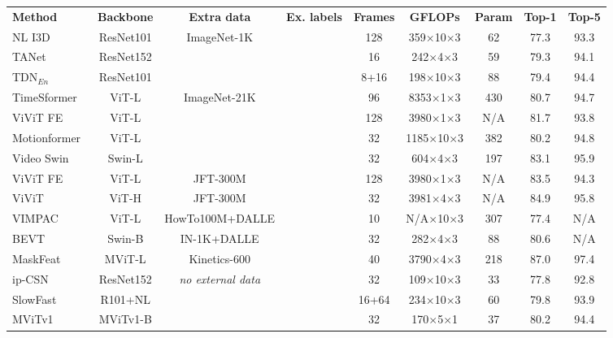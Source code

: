 \documentclass{article}
\newcommand{\cmark}{\ding{51}}%
\newcommand{\xmark}{\ding{55}}%
\def\x{$\times$}
\newcommand{\tablestyle}[2]{\setlength{\tabcolsep}{#1}\renewcommand{\arraystretch}{#2}\centering\footnotesize}
\begin{document}
\begin{table}[t!]
\centering
\tablestyle{2.0pt}{1.04}
\begin{tabular}{l|c|c|c|c|c|c|c|c}
\textbf{Method} & \textbf{Backbone} & \textbf{Extra data} & \textbf{Ex. labels} & \textbf{Frames} & \textbf{GFLOPs}  & \textbf{Param} & \textbf{Top-1}  & \textbf{Top-5} \\
\shline\hline
NL I3D~\cite{nonlocal} & ResNet101 &   \multirow{3}{*}{ImageNet-1K}    & \cmark & 128 & 359\x10\x3  & 62  & 77.3 & 93.3    \\
TANet~\cite{tanet} &  ResNet152 & & \cmark &16 & 242\x4\x3 & 59 & 79.3 & 94.1 \\
TDN$_{En}$~\cite{tdn} & ResNet101 &   & \cmark & 8+16 & 198\x10\x3 & 88 & 79.4 & 94.4   \\
\hline
TimeSformer~\cite{timesformer} & ViT-L & \multirow{4}{*}{ImageNet-21K}  & \cmark & 96 & 8353\x1\x3 & 430 & 80.7 & 94.7 \\
ViViT FE~\cite{vivit} & ViT-L &  & \cmark & 128 & 3980\x 1\x3 & N/A & 81.7 & 93.8 \\
Motionformer~\cite{motionformer} & ViT-L &    & \cmark & 32 & 1185\x10\x3 & 382  & 80.2 & 94.8 \\
Video Swin~\cite{liu2021video}  & Swin-L &   & \cmark & 32 & 604\x4\x3 & 197 & 83.1 & 95.9  \\
\hline
ViViT FE~\cite{vivit} & ViT-L & JFT-300M  & \cmark & 128 & 3980\x 1\x3  & N/A & 83.5 & 94.3 \\
ViViT~\cite{vivit} & ViT-H & JFT-300M & \cmark & 32 & 3981\x 4\x3 & N/A & 84.9 & 95.8 \\
VIMPAC~\cite{vimpac} & ViT-L & \scriptsize{HowTo100M+DALLE} & \xmark & 10 & N/A\x10\x3 & 307 & 77.4 & N/A \\
BEVT~\cite{bevt}  & Swin-B & IN-1K+DALLE  & \xmark & 32 & 282\x4\x3 & 88 & 80.6 & N/A  \\
MaskFeat{\scriptsize\textuparrow352}~\cite{wei2021masked} & MViT-L & Kinetics-600  & \xmark & 40 & 3790\x4\x3 & 218 & 87.0 & 97.4 \\
\hline
ip-CSN~\cite{csn} & ResNet152 & \multirow{4}{*}{\emph{no external data}} & \xmark & 32 & 109$\times$10$\times$3 & 33 & 77.8 & 92.8 \\
SlowFast~\cite{slowfast} &  R101+NL &   & \xmark & 16+64 & 234\x10\x3 & 60 & 79.8 & 93.9 \\
MViTv1~\cite{mvit} & MViTv1-B &  & \xmark & 32 & 170\x5\x1 & 37  & 80.2 & 94.4 \\

\end{tabular}
\end{table}
\end{document}
